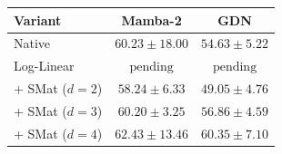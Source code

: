 \begin{tabular}{lcc}
\toprule
Variant & Mamba-2 & GDN \\
\midrule
Native & $60.23 \pm 18.00$ & $54.63 \pm 5.22$ \\
Log-Linear & $\text{pending}$ & $\text{pending}$ \\
+ SMat ($d=2$) & $58.24 \pm 6.33$ & $49.05 \pm 4.76$ \\
+ SMat ($d=3$) & $60.20 \pm 3.25$ & $56.86 \pm 4.59$ \\
+ SMat ($d=4$) & $62.43 \pm 13.46$ & $60.35 \pm 7.10$ \\
\bottomrule
\end{tabular}
